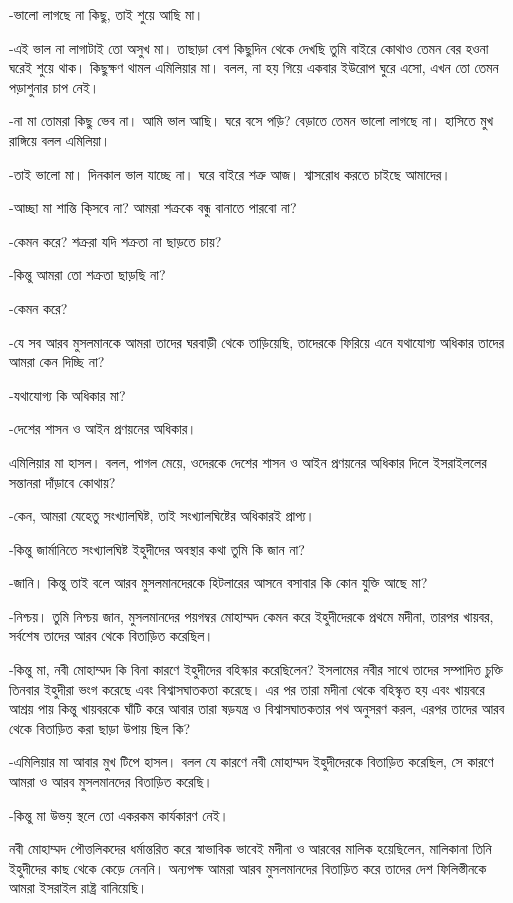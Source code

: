 \documentclass[
]{book}
\begin{document}
-ভালো লাগছে না কিছু, তাই শুয়ে আছি মা।

-এই ভাল না লাগাটাই তো অসুখ মা। তাছাড়া বেশ কিছুদিন থেকে দেখছি তুমি বাইরে কোথাও তেমন বের হওনা ঘরেই শুয়ে থাক। কিছুক্ষণ থামল এমিলিয়ার মা। বলল, না হয় গিয়ে একবার ইউরোপ ঘুরে এসো, এখন তো তেমন পড়াশুনার চাপ নেই।

-না মা তোমরা কিছু ভেব না। আমি ভাল আছি। ঘরে বসে পড়ি? বেড়াতে তেমন ভালো লাগছে না। হাসিতে মুখ রাঙ্গিয়ে বলল এমিলিয়া।

-তাই ভালো মা। দিনকাল ভাল যাচ্ছে না। ঘরে বাইরে শত্রু আজ। শ্বাসরোধ করতে চাইছে আমাদের।

-আচ্ছা মা শান্তি কি্সবে না? আমরা শক্রকে বন্ধু বানাতে পারবো না?

-কেমন করে? শক্ররা যদি শক্রতা না ছাড়তে চায়?

-কিন্তু আমরা তো শক্রতা ছাড়ছি না?

-কেমন করে?

-যে সব আরব মুসলমানকে আমরা তাদের ঘরবাড়ী থেকে তাড়িয়েছি, তাদেরকে ফিরিয়ে এনে যথাযোগ্য অধিকার তাদের আমরা কেন দিচ্ছি না?

-যথাযোগ্য কি অধিকার মা?

-দেশের শাসন ও আইন প্রণয়নের অধিকার।

এমিলিয়ার মা হাসল। বলল, পাগল মেয়ে, ওদেরকে দেশের শাসন ও আইন প্রণয়নের অধিকার দিলে ইসরাইললের সন্তানরা দাঁড়াবে কোথায়?

-কেন, আমরা যেহেতু সংখ্যালঘিষ্ট, তাই সংখ্যালঘিষ্টের অধিকারই প্রাপ্য।

-কিন্তু জার্মানিতে সংখ্যালঘিষ্ট ইহুদীদের অবস্থার কথা তুমি কি জান না?

-জানি। কিন্তু তাই বলে আরব মুসলমানদেরকে হিটলারের আসনে বসাবার কি কোন যুক্তি আছে মা?

-নিশ্চয়। তুমি নিশ্চয় জান, মুসলমানদের পয়গম্বর মোহাম্মদ কেমন করে ইহুদীদেরকে প্রথমে মদীনা, তারপর খায়বর, সর্বশেষ তাদের আরব থেকে বিতাড়িত করেছিল।

-কিন্তু মা, নবী মোহাম্মদ কি বিনা কারণে ইহুদীদের বহিস্কার করেছিলেন? ইসলামের নবীর সাথে তাদের সম্পাদিত চুক্তি তিনবার ইহুদীরা ভংগ করেছে এবং বিশ্বাসঘাতকতা করেছে। এর পর তারা মদীনা থেকে বহিস্কৃত হয় এবং খায়বরে আশ্রয় পায় কিন্তু খায়বরকে ঘাঁটি করে আবার তারা ষড়যন্ত্র ও বিশ্বাসঘাতকতার পথ অনুসরণ করল, এরপর তাদের আরব থেকে বিতাড়িত করা ছাড়া উপায় ছিল কি?

-এমিলিয়ার মা আবার মুখ টিপে হাসল। বলল যে কারণে নবী মোহাম্মদ ইহুদীদেরকে বিতাড়িত করেছিল, সে কারণে আমরা ও আরব মুসলমানদের বিতাড়িত করেছি।

-কিন্তু মা উভয় স্থলে তো একরকম কার্যকারণ নেই।

নবী মোহাম্মদ পৌত্তলিকদের ধর্মান্তরিত করে স্বাভাবিক ভাবেই মদীনা ও আরবের মালিক হয়েছিলেন, মালিকানা তিনি ইহুদীদের কাছ থেকে কেড়ে নেননি। অন্যপক্ষ আমরা আরব মুসলমানদের বিতাড়িত করে তাদের দেশ ফিলিস্তীনকে আমরা ইসরাইল রাষ্ট্র বানিয়েছি।
\end{document}
